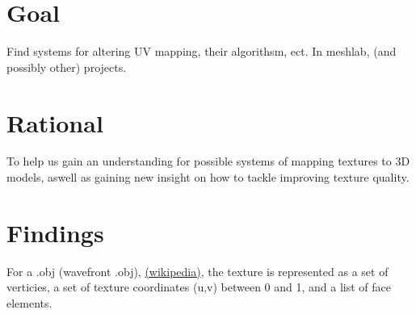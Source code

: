 

\usepackage{hyperref}




\section{Goal}

Find systems for altering UV mapping, their algorithsm, ect. In meshlab, (and possibly other) projects.

\section{Rational}

To help us gain an understanding for possible systems of mapping textures to 3D models, aswell as gaining new insight on how to tackle improving texture quality.

\section{Findings}

For a .obj (wavefront .obj), \href{https://en.wikipedia.org/wiki/Wavefront_.obj_file}{(wikipedia)}, the texture is represented as a set of verticies, a set of texture coordinates (u,v) between 0 and 1, and a list of face elements. 

%
%
%




